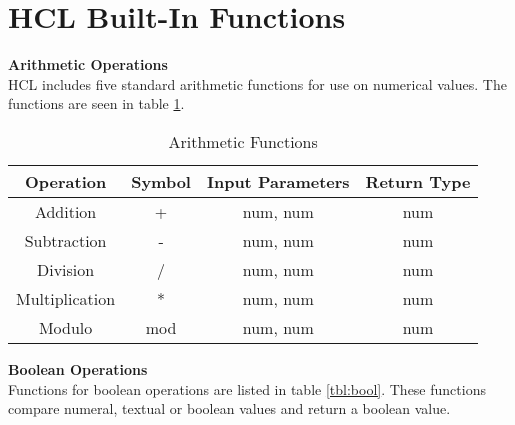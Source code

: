 \section{HCL Built-In Functions}
\label{builtinAppend}
\textbf{Arithmetic Operations}\\
HCL includes five standard arithmetic functions for use on numerical values.
The functions are seen in table \ref{tbl:arith}.

\begin{table}[ht]
	\centering
	\caption{Arithmetic Functions}
	\label{tbl:arith}
	\begin{tabular}{|c|c|c|c|}
		\hline
		\textbf{Operation}      & \textbf{Symbol} & \textbf{Input Parameters} & \textbf{Return Type} \\ \hline
		Addition       & +      & num, num         & num         \\ \hline
		Subtraction    & -      & num, num         & num         \\ \hline
		Division       & /      & num, num         & num         \\ \hline
		Multiplication & *      & num, num         & num         \\ \hline
		Modulo         & mod    & num, num         & num         \\ \hline
	\end{tabular}
\end{table}

\textbf{Boolean Operations}\\
Functions for boolean operations are listed in table \ref{tbl:bool}.
These functions compare numeral, textual or boolean values and return a boolean value.

